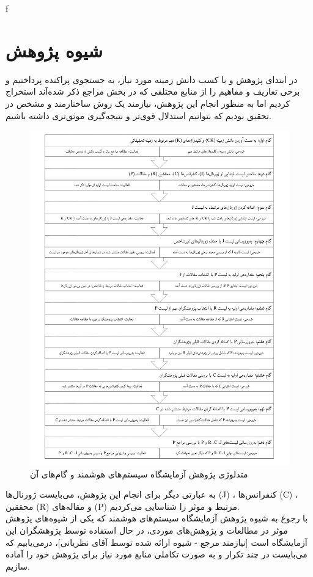 f\chapter{شیوه پژوهش‌}
در ابتدای پژوهش و با کسب دانش ‌زمینه مورد نیاز، به جستجوی پراکنده پرداختیم و برخی تعاریف و مفاهیم را از منابع مختلفی که در بخش مراجع ذکر شده‌آند استخراج کردیم اما به منظور انجام این پژوهش، نیازمند یک روش ساختارمند و مشخص در تحقیق بودیم که بتوانیم استدلال قوی‌تر و نتیجه‌گیری موثق‌تری داشته باشیم.
\begin{figure}[H]
	\centering\includegraphics[width=0.95\linewidth]{Resources/ISLAB_methodology.pdf}
	\caption{متدلوژی پژوهش آزمایشگاه سیستم‌های هوشمند و گام‌های آن}
	\label{fig:islab}
\end{figure}
به عبارتی دیگر برای انجام این پژوهش، می‌بایست ژورنال‌ها (J) ، کنفرانس‌ها (C) ، محققین‌ (R) و مقاله‌های (P) مرتبط و موثر را شناسایی می‌کردیم.\\
با رجوع به شیوه پژوهش آزمایشگاه سیستم‌های هوشمند
که یکی از  شیوه‌های پژوهش موثر در مطالعات و پژوهش‌های موردی، در حال استفاده توسط پژوهشگران این آزمایشگاه است [نیازمند مرجع - شیوه ارائه شده توسط آقای نظریانی]، درمی‌یابیم که می‌بایست در چند تکرار و به صورت تکاملی منابع مورد نیاز برای پژوهش خود را آماده سازیم.\\
